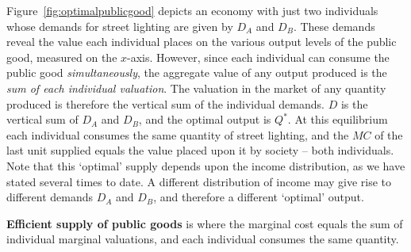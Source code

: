 Figure~\ref{fig:optimalpublicgood} depicts an economy with just two
individuals whose demands for street lighting are given by $D_A$ and $D_B$.
These demands reveal the value each individual places on the various output
levels of the public good, measured on the $x$-axis. However, since each
individual can consume the public good \textit{simultaneously}, the
aggregate value of any output produced is the \textit{sum of each individual
	valuation}. The valuation in the market of any quantity produced is
therefore the vertical sum of the individual demands. $D$ is the vertical
sum of $D_A$ and $D_B$, and the optimal output is $Q^*$. At this equilibrium
each individual consumes the same quantity of street lighting, and the $MC$
of the last unit supplied equals the value placed upon it by society -- both
individuals. Note that this `optimal' supply depends upon the income
distribution, as we have stated several times to date. A different
distribution of income may give rise to different demands $D_A$ and $D_B$,
and therefore a different `optimal' output.

\begin{DefBox}
	\textbf{Efficient supply of public goods} is where the marginal cost equals the sum of individual marginal valuations, and each individual consumes the same quantity.
\end{DefBox}

